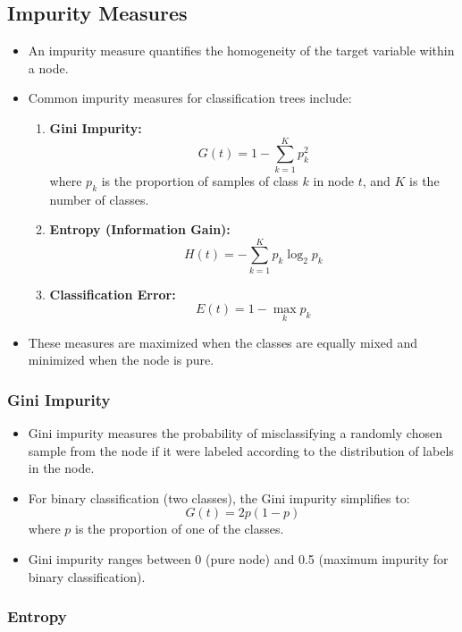 \documentclass{article}
\begin{document}
\subsection{Impurity Measures}

\begin{itemize}
    \item An impurity measure quantifies the homogeneity of the target variable within a node.
    \item Common impurity measures for classification trees include:
    \begin{enumerate}
        \item \textbf{Gini Impurity:}
        \[
        G(t) = 1 - \sum_{k=1}^K p_k^2
        \]
        where $p_k$ is the proportion of samples of class $k$ in node $t$, and $K$ is the number of classes.
        \item \textbf{Entropy (Information Gain):}
        \[
        H(t) = -\sum_{k=1}^K p_k \log_2 p_k
        \]
        \item \textbf{Classification Error:}
        \[
        E(t) = 1 - \max_k p_k
        \]
    \end{enumerate}
    \item These measures are maximized when the classes are equally mixed and minimized when the node is pure.
\end{itemize}

\subsubsection{Gini Impurity}

\begin{itemize}
    \item Gini impurity measures the probability of misclassifying a randomly chosen sample from the node if it were labeled according to the distribution of labels in the node.
    \item For binary classification (two classes), the Gini impurity simplifies to:
    \[
    G(t) = 2 p (1 - p)
    \]
    where $p$ is the proportion of one of the classes.
    \item Gini impurity ranges between 0 (pure node) and 0.5 (maximum impurity for binary classification).
\end{itemize}

\subsubsection{Entropy}
\end{document}
